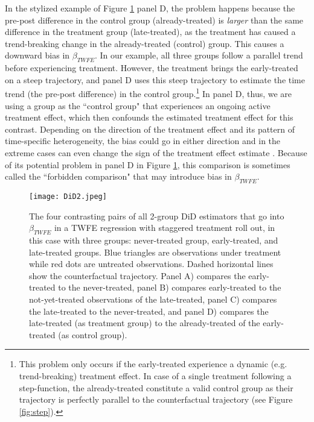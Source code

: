 In the stylized example of Figure \ref{fig:Bacon} panel D, the problem happens because the pre-post difference in the control group (already-treated) is \emph{larger} than the same difference in the treatment group (late-treated), as the treatment has caused a trend-breaking change in the already-treated (control) group. This causes a downward bias in $\beta_{TWFE}$. In our example, all three groups follow a parallel trend before experiencing treatment. However, the treatment brings the early-treated on a steep trajectory, and panel D uses this steep trajectory to estimate the time trend (the pre-post difference) in the control group.\footnote{This problem only occurs if the early-treated experience a dynamic (e.g. trend-breaking) treatment effect. In case of a single treatment following a step-function, the already-treated constitute a valid control group as their trajectory is perfectly parallel to the counterfactual trajectory (see Figure \ref{fig:step}).} In panel D, thus, we are using a group as the ``control group" that experiences an ongoing active treatment effect, which then confounds the estimated treatment effect for this contrast. Depending on the direction of the treatment effect and its pattern of time-specific heterogeneity, the bias could go in either direction and in the extreme cases can even change the sign of the treatment effect estimate \cite{Roth.2023}. Because of its potential problem in panel D in Figure \ref{fig:Bacon}, this comparison is sometimes called the ``forbidden comparison" \cite{Borusyak.2023} that may introduce bias in $\beta_{TWFE}$. 


\begin{figure}[t]
  \centering
  \texttt{[image: DiD2.jpeg]}
  \caption{The four contrasting pairs of all 2-group DiD estimators that go into $\beta_{TWFE}$ in a TWFE regression with staggered treatment roll out, in this case with three groups: never-treated group, early-treated, and late-treated groups. Blue triangles are observations under treatment while red dots are untreated observations. Dashed horizontal lines show the counterfactual trajectory. Panel A) compares the early-treated to the never-treated, panel B) compares early-treated to the not-yet-treated observations of the late-treated, panel C) compares the late-treated to the never-treated, and panel D) compares the late-treated (as treatment group) to the already-treated of the early-treated (as control group).
  }
  \label{fig:Bacon}
\end{figure}

